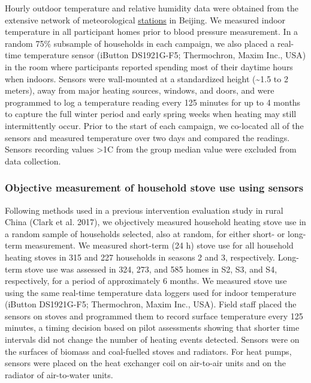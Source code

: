 \documentclass[
  letterpaper,
  DIV=11,
  numbers=noendperiod]{scrartcl}
\begin{document}
Hourly outdoor temperature and relative humidity data were obtained from
the extensive network of meteorological
\href{http://beijingair.sinaapp.com}{stations} in Beijing. We measured
indoor temperature in all participant homes prior to blood pressure
measurement. In a random 75\% subsample of households in each campaign,
we also placed a real-time temperature sensor (iButton DS1921G-F5;
Thermochron, Maxim Inc., USA) in the room where participants reported
spending most of their daytime hours when indoors. Sensors were
wall-mounted at a standardized height (\textasciitilde1.5 to 2 meters),
away from major heating sources, windows, and doors, and were programmed
to log a temperature reading every 125 minutes for up to 4 months to
capture the full winter period and early spring weeks when heating may
still intermittently occur. Prior to the start of each campaign, we
co-located all of the sensors and measured temperature over two days and
compared the readings. Sensors recording values \textgreater1C from the
group median value were excluded from data collection.

\hypertarget{objective-measurement-of-household-stove-use-using-sensors}{%
\subsubsection{Objective measurement of household stove use using
sensors}\label{objective-measurement-of-household-stove-use-using-sensors}}

Following methods used in a previous intervention evaluation study in
rural China (Clark et al. 2017), we objectively measured household
heating stove use in a random sample of households selected, also at
random, for either short- or long-term measurement. We measured
short-term (24 h) stove use for all household heating stoves in 315 and
227 households in seasons 2 and 3, respectively. Long-term stove use was
assessed in 324, 273, and 585 homes in S2, S3, and S4, respectively, for
a period of approximately 6 months. We measured stove use using the same
real-time temperature data loggers used for indoor temperature (iButton
DS1921G-F5; Thermochron, Maxim Inc., USA). Field staff placed the
sensors on stoves and programmed them to record surface temperature
every 125 minutes, a timing decision based on pilot assessments showing
that shorter time intervals did not change the number of heating events
detected. Sensors were on the surfaces of biomass and coal-fuelled
stoves and radiators. For heat pumps, sensors were placed on the heat
exchanger coil on air-to-air units and on the radiator of air-to-water
units.
\end{document}
